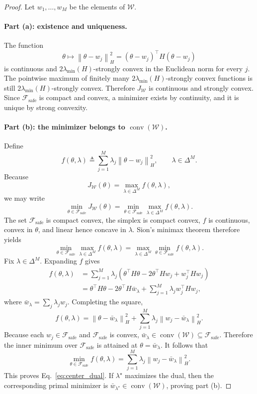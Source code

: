 \documentclass{article}
\newcommand{\cF}{\mathcal{F}}
\newcommand{\cW}{\mathcal{W}}
\newcommand{\conv}{\operatorname{conv}}
\newcommand{\simplex}{\Delta}
\newcommand{\norm}[1]{\left\lVert #1 \right\rVert}
\newcommand{\paren}[1]{\left( #1 \right)}
\newcommand{\safe}{\mathrm{safe}}
\begin{document}
\begin{proof}
Let \(w_1,\ldots,w_M\) be the elements of \(\cW\).

\paragraph{Part (a): existence and uniqueness.}
The function
\[
\theta \mapsto \norm{\theta-w_j}_H^2
=
(\theta-w_j)^\top H (\theta-w_j)
\]
is continuous and \(2\lambda_{\min}(H)\)-strongly convex in the Euclidean norm for every \(j\). The pointwise maximum of finitely many \(2\lambda_{\min}(H)\)-strongly convex functions is still \(2\lambda_{\min}(H)\)-strongly convex. Therefore \(J_{\cW}\) is continuous and strongly convex. Since \(\cF_{\safe}\) is compact and convex, a minimizer exists by continuity, and it is unique by strong convexity.

\paragraph{Part (b): the minimizer belongs to \(\conv(\cW)\).}
Define
\[
f(\theta,\lambda)
\triangleq
\sum_{j=1}^{M}\lambda_j \norm{\theta-w_j}_H^2,
\qquad
\lambda\in\simplex^M.
\]
Because
\[
J_{\cW}(\theta)
=
\max_{\lambda\in\simplex^M} f(\theta,\lambda),
\]
we may write
\[
\min_{\theta\in\cF_{\safe}} J_{\cW}(\theta)
=
\min_{\theta\in\cF_{\safe}} \max_{\lambda\in\simplex^M} f(\theta,\lambda).
\]
The set \(\cF_{\safe}\) is compact convex, the simplex is compact convex, \(f\) is continuous, convex in \(\theta\), and linear hence concave in \(\lambda\). Sion's minimax theorem \citep{sion1958minimax} therefore yields
\[
\min_{\theta\in\cF_{\safe}} \max_{\lambda\in\simplex^M} f(\theta,\lambda)
=
\max_{\lambda\in\simplex^M} \min_{\theta\in\cF_{\safe}} f(\theta,\lambda).
\]
Fix \(\lambda\in\simplex^M\). Expanding \(f\) gives
\begin{align*}
f(\theta,\lambda)
&=
\sum_{j=1}^{M}\lambda_j
\paren{
\theta^\top H\theta - 2 \theta^\top H w_j + w_j^\top H w_j
}\\
&=
\theta^\top H\theta - 2\theta^\top H \bar w_\lambda
+
\sum_{j=1}^{M}\lambda_j w_j^\top H w_j,
\end{align*}
where \(\bar w_\lambda = \sum_j \lambda_j w_j\). Completing the square,
\[
f(\theta,\lambda)
=
\norm{\theta-\bar w_\lambda}_H^2
+
\sum_{j=1}^{M}\lambda_j \norm{w_j-\bar w_\lambda}_H^2.
\]
Because each \(w_j\in\cF_{\safe}\) and \(\cF_{\safe}\) is convex, \(\bar w_\lambda\in\conv(\cW)\subseteq \cF_{\safe}\). Therefore the inner minimum over \(\cF_{\safe}\) is attained at \(\theta=\bar w_\lambda\). It follows that
\[
\min_{\theta\in\cF_{\safe}} f(\theta,\lambda)
=
\sum_{j=1}^{M}\lambda_j \norm{w_j-\bar w_\lambda}_H^2.
\]
This proves Eq.~\eqref{eq:center_dual}. If \(\lambda^\star\) maximizes the dual, then the corresponding primal minimizer is \(\bar w_{\lambda^\star}\in \conv(\cW)\), proving part (b).


\end{proof}
\end{document}
